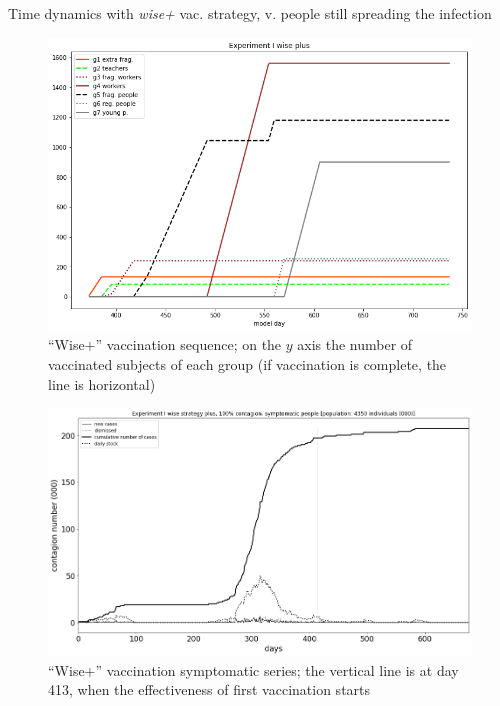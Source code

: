 \documentclass[9pt]{beamer}
\begin{document}
\begin{frame}{Time dynamics with \emph{wise+} vac. strategy, v. people still spreading the infection}

\begin{figure}[H]
\center
\includegraphics[scale=0.16]{Experiment_I_wisePlusVaccinationSequence.png} %

\caption{``Wise+'' vaccination sequence; on the $y$ axis the number of vaccinated subjects of each group (if vaccination is complete, the line is horizontal)} 
\label{Experiment_I_wiseVaccinationSequence}
\end{figure}

\begin{figure}[H]
\center
\includegraphics[scale=0.16]{Experiment_I_1_wisePlus_symptomatic_series.png} 

\caption{``Wise+'' vaccination symptomatic series; the vertical line is at day 413, when the effectiveness of first vaccination starts} 
\label{Experiment_I_wiseSymptomaticSeries}
\end{figure}



\end{frame}
\end{document}
